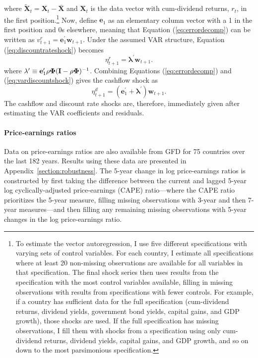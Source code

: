 where $\tilde{\mathbf{X}}_{t}=\mathbf{X}_{t}-\bar{\mathbf{X}}$ and $\mathbf{X}_{t}$ is the data vector with cum-dividend returns, $r_{t}$, in the first position.\footnote{To estimate the vector autoregression, I use five different specifications with varying sets of control variables. For each country, I estimate all specifications where at least 20 non-missing observations are available for all variables in that specification. The final shock series then uses results from the specification with the most control variables available, filling in missing observations with results from specifications with fewer controls. For example, if a country has sufficient data for the full specification (cum-dividend returns, dividend yields, government bond yields, capital gains, and GDP growth), those shocks are used. If the full specification has missing observations, I fill them with shocks from a specification using only cum-dividend returns, dividend yields, capital gains, and GDP growth, and so on down to the most parsimonious specification.} Now, define $\mathbf{e}_{1}$ as an elementary column vector with a 1 in the first position and 0s elsewhere, meaning that Equation (\ref{eq:errordecomp}) can be written as $v^{r}_{t+1} = \mathbf{e}_{1}^{\prime}\mathbf{w}_{t+1}$. Under the assumed VAR structure, Equation (\ref{eq:discountrateshock}) becomes
\begin{equation}
\eta^{r}_{t+1} =\mathbf{\lambda}^{\prime} \mathbf{w}_{t+1}.\label{eq:vardiscountshock}
\end{equation}
where $\mathbf{\lambda}^{\prime} \equiv\mathbf{e}_{1}^{\prime}\text{\ensuremath{\rho}}\mathbf{\Phi}(\mathbf{I}-\rho\mathbf{\Phi})^{-1}$. Combining Equations (\ref{eq:errordecomp}) and (\ref{eq:vardiscountshock}) gives the cashflow shock as
\begin{equation}
\eta^{d}_{t+1} =(\mathbf{e}_{1}^{\prime}+\mathbf{\lambda}^{\prime})\mathbf{w}_{t+1}.
\end{equation}
The cashflow and discount rate shocks are, therefore, immediately given after estimating the VAR coefficients and residuals.

\paragraph{Price-earnings ratios}
Data on price-earnings ratios are also available from GFD for 75 countries over the last 182 years. Results using these data are presented in Appendix~\ref{section:robustness}. The 5-year change in log price-earnings ratios is constructed by first taking the difference between the current and lagged 5-year log cyclically-adjusted price-earnings (CAPE) ratio---where the CAPE ratio prioritizes the 5-year measure, filling missing observations with 3-year and then 7-year measures---and then filling any remaining missing observations with 5-year changes in the log price-earnings ratio.

